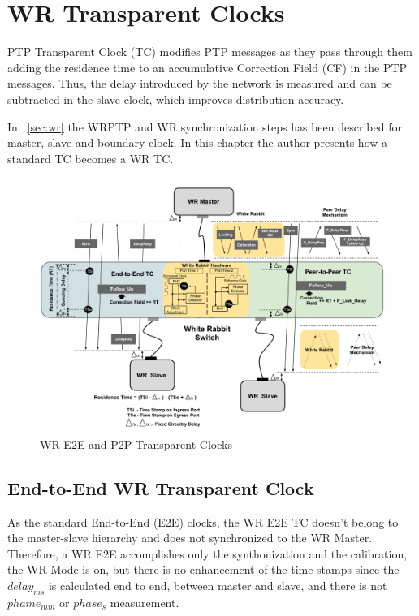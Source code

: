 \section{WR Transparent Clocks}
\label{sec:wr_tc}
PTP Transparent Clock (TC) modifies PTP messages as they pass through them
adding the residence time to an accumulative Correction Field (CF) in the PTP 
messages. Thus, the delay introduced  by the network is measured and can be 
subtracted in the slave clock, which improves distribution accuracy.

In ~\ref{sec:wr} the WRPTP and WR synchronization steps has been described for
master, slave and boundary clock. In this chapter the author presents how a
standard TC becomes a WR TC.

\begin{figure}[!t]
\centering
\includegraphics[scale=0.27]{fig/wr_schema_hw_bw.png}
\caption{WR E2E and P2P Transparent Clocks}
\label{fig:wr_tc}
\end{figure}

\subsection{End-to-End WR Transparent Clock}

As the standard End-to-End (E2E) clocks, the WR E2E TC doesn't belong to the
master-slave hierarchy and does not synchronized to the WR Master. 
Therefore, a WR E2E accomplishes only the synthonization and the calibration,
the WR Mode is on, but there is no enhancement of the time stamps since the  
$delay_{ms}$ is calculated end to end, between master and slave, and there is 
not $phame_{mm}$ or $phase_{s}$ measurement. 

